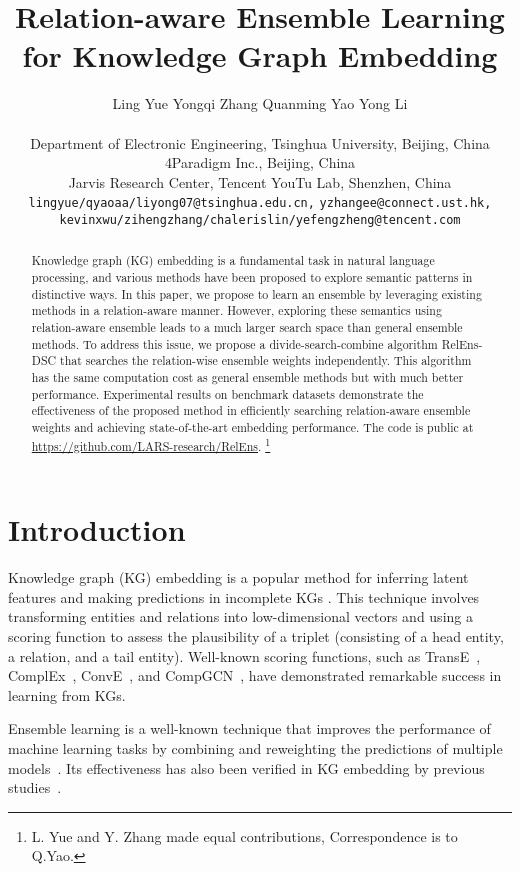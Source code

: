 \documentclass[11pt,a4paper]{article}
\title{Relation-aware Ensemble Learning for Knowledge Graph Embedding}
\author{Ling Yue \quad  Yongqi Zhang \quad Quanming Yao \quad Yong Li \\
	\quad {\bf Xian Wu} \quad {\bf Ziheng Zhang} \quad {\bf Zhenxi Lin} \quad {\bf Yefeng Zheng} \\
	Department of Electronic Engineering, Tsinghua University, Beijing, China \\
	4Paradigm Inc., Beijing, China \\
	Jarvis Research Center, Tencent YouTu Lab, Shenzhen, China \\
	\texttt{\small {lingyue/qyaoaa/liyong07}@tsinghua.edu.cn,}
	\texttt{\small yzhangee@connect.ust.hk,} \\
	\texttt{\small {kevinxwu/zihengzhang/chalerislin/yefengzheng}@tencent.com}
}
\begin{document}
  \maketitle
  
  \begin{abstract}
    Knowledge graph (KG) embedding is a fundamental task
    in natural language processing,
    and various methods have been proposed to
    explore semantic patterns in distinctive ways.
    In this paper,
    we propose to learn an ensemble 
    by leveraging existing methods in a relation-aware manner.
    However,
    exploring these semantics using relation-aware ensemble leads to
    a much larger search space than general ensemble methods.
    To address this issue, we propose a divide-search-combine algorithm RelEns-DSC
    that searches the relation-wise ensemble weights independently.
    This algorithm has the same computation cost as general ensemble methods but with much better performance.
    Experimental results on benchmark datasets demonstrate 
    the effectiveness of the proposed method in efficiently searching relation-aware ensemble weights 
    and achieving state-of-the-art embedding performance.
    The code is public at \url{https://github.com/LARS-research/RelEns}.
    \footnote{L. Yue and Y. Zhang made equal contributions,
    Correspondence is to Q.Yao.}
  \end{abstract}
  
  
  \section{Introduction}
  
  Knowledge graph (KG) embedding is a popular method
  for inferring latent features
  and making predictions in incomplete KGs \cite{ji2021survey}.
  This  technique involves transforming entities and relations
  into low-dimensional vectors
  and using a scoring function \cite{bordes2013translating,wang2017knowledge}
  to assess the plausibility of a triplet
  (consisting of a head entity, a relation, and a tail entity).
  Well-known scoring functions,
  such as TransE~\cite{bordes2013translating},
  ComplEx~\cite{trouillon2017knowledge},
  ConvE~\cite{dettmers2018convolutional},
  and CompGCN~\cite{vashishth2019composition},
  have demonstrated remarkable success in learning from KGs.
  
  
  
  Ensemble learning
  is a well-known technique that improves the performance of machine learning tasks
  by combining and reweighting the predictions of multiple models~\cite{breiman1996bagging, wolpert1992stacked, dietterich2000ensemble}.
  Its effectiveness has also been verified in KG embedding
  by previous studies~\cite{krompass2015ensemble,wang2022probabilistic,rivas2022ensembles}.
  
\end{document}
